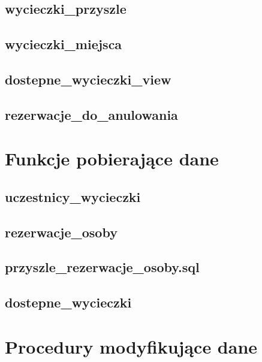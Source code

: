 \documentclass[12pt]{article}
\begin{document}
\subsection{wycieczki\_przyszle}


\subsection{wycieczki\_miejsca}


\subsection{dostepne\_wycieczki\_view}


\subsection{rezerwacje\_do\_anulowania}


\section{Funkcje pobierające dane}

\subsection{uczestnicy\_wycieczki}


\subsection{rezerwacje\_osoby}


\subsection{przyszle\_rezerwacje\_osoby.sql}


\subsection{dostepne\_wycieczki}


\section{Procedury modyfikujące dane}
\end{document}
